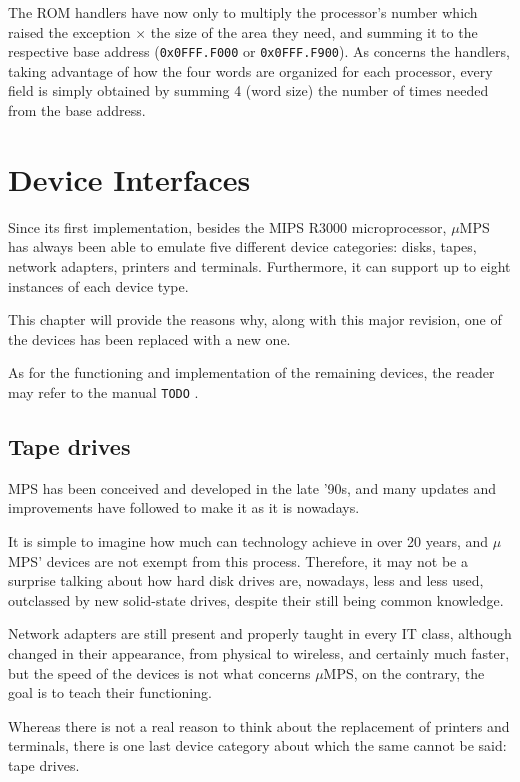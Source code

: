 \documentclass[12pt,a4paper,openright,twoside]{report}
\begin{document}
The ROM handlers have now only to multiply the processor's number which raised the exception $\times$ the size of the area they need, and summing it to the respective base address (\texttt{0x0FFF.F000} or \texttt{0x0FFF.F900}).
As concerns the handlers, taking advantage of how the four words are organized for each processor, every field is simply obtained by summing 4 (word size) the number of times needed from the base address.

\chapter{Device Interfaces}
\lhead[\fancyplain{}{\bfseries\thepage}]{\fancyplain{}{\bfseries\rightmark}}
Since its first implementation, besides the MIPS R3000 microprocessor, $\mu$MPS has always been able to emulate five different device categories: disks, tapes, network adapters, printers and terminals.
Furthermore, it can support up to eight instances of each device type.

This chapter will provide the reasons why, along with this major revision, one of the devices has been replaced with a new one.

As for the functioning and implementation of the remaining devices, the reader may refer to the manual \texttt{TODO} \cite{pops}.

\section{Tape drives}
MPS has been conceived and developed in the late '90s, and many updates and improvements have followed to make it as it is nowadays.

It is simple to imagine how much can technology achieve in over 20 years, and $\mu$MPS' devices are not exempt from this process.
Therefore, it may not be a surprise talking about how hard disk drives are, nowadays, less and less used, outclassed by new solid-state drives, despite their still being common knowledge.

Network adapters are still present and properly taught in every IT class, although changed in their appearance, from physical to wireless, and certainly much faster, but the speed of the devices is not what concerns $\mu$MPS, on the contrary, the goal is to teach their functioning.

Whereas there is not a real reason to think about the replacement of printers and terminals, there is one last device category about which the same cannot be said: tape drives.
\end{document}
